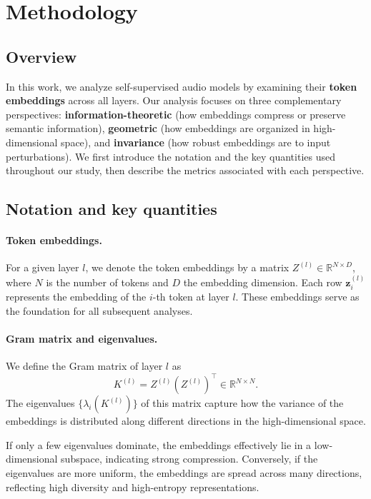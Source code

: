 \documentclass{Interspeech}
\begin{document}
\section{Methodology}
\label{sec:methodology}

\subsection{Overview}
In this work, we analyze self-supervised audio models by examining their \textbf{token embeddings} across all layers. 
Our analysis focuses on three complementary perspectives: 
\textbf{information-theoretic} (how embeddings compress or preserve semantic information), 
\textbf{geometric} (how embeddings are organized in high-dimensional space), and 
\textbf{invariance} (how robust embeddings are to input perturbations). 
We first introduce the notation and the key quantities used throughout our study, then describe the metrics associated with each perspective.

\subsection{Notation and key quantities}
\label{sec:notation}
\paragraph{Token embeddings.} For a given layer $l$, we denote the token embeddings by a matrix $Z^{(l)} \in \mathbb{R}^{N \times D}$, 
where $N$ is the number of tokens and $D$ the embedding dimension. 
Each row $\mathbf{z}_i^{(l)}$ represents the embedding of the $i$-th token at layer $l$. 
These embeddings serve as the foundation for all subsequent analyses.

\paragraph{Gram matrix and eigenvalues.} We define the Gram matrix of layer $l$ as
\[
K^{(l)} = Z^{(l)} (Z^{(l)})^\top \in \mathbb{R}^{N \times N}.
\] 
The eigenvalues $\{\lambda_i(K^{(l)})\}$ of this matrix capture how the variance of the embeddings is distributed along different directions in the high-dimensional space.

\begin{tcolorbox}[colback=gray!10,colframe=black!50,title=Intuition]
If only a few eigenvalues dominate, the embeddings effectively lie in a low-dimensional subspace, indicating strong compression.  
Conversely, if the eigenvalues are more uniform, the embeddings are spread across many directions, reflecting high diversity and high-entropy representations.
\end{tcolorbox}
\end{document}

